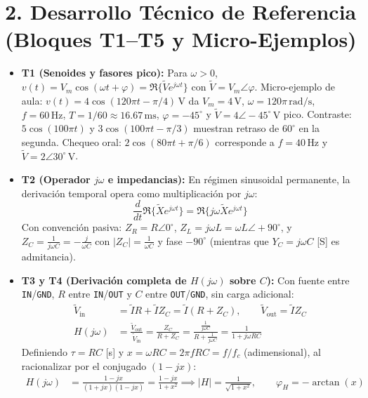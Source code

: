 \documentclass[11pt, a4paper]{article}
\newcommand{\phasor}[1]{\widetilde{#1}}
\begin{document}
\section*{2. Desarrollo Técnico de Referencia (Bloques T1--T5 y Micro-Ejemplos)}
\begin{itemize}\setlength\itemsep{0.2cm}
    \item \textbf{T1 (Senoides y fasores pico):} Para $\omega > 0$, $v(t) = V_m\cos(\omega t + \varphi) = \Re\{\phasor{V}e^{j\omega t}\}$ con $\phasor{V} = V_m\angle\varphi$. Micro-ejemplo de aula: $v(t) = 4\cos(120\pi t - \pi/4)\,\text{V}$ da $V_m = 4\,\text{V}$, $\omega = 120\pi\,\text{rad/s}$, $f = 60\,\text{Hz}$, $T = 1/60 \approx 16.67\,\text{ms}$, $\varphi = -45^\circ$ y $\phasor{V} = 4\angle -45^\circ\,\text{V}$ pico. Contraste: $5\cos(100\pi t)$ y $3\cos(100\pi t - \pi/3)$ muestran retraso de $60^\circ$ en la segunda. Chequeo oral: $2\cos(80\pi t + \pi/6)$ corresponde a $f = 40\,\text{Hz}$ y $\phasor{V} = 2\angle 30^\circ\,\text{V}$.
    \item \textbf{T2 (Operador $j\omega$ e impedancias):} En régimen sinusoidal permanente, la derivación temporal opera como multiplicación por $j\omega$:
    $$\frac{d}{dt}\Re\{\phasor{X}e^{j\omega t}\} = \Re\{j\omega\phasor{X}e^{j\omega t}\}$$
    Con convención pasiva: $Z_R = R\angle 0^\circ$, $Z_L = j\omega L = \omega L\angle +90^\circ$, y $Z_C = \frac{1}{j\omega C} = -\frac{j}{\omega C}$ con $|Z_C| = \frac{1}{\omega C}$ y fase $-90^\circ$ (mientras que $Y_C = j\omega C$ [S] es admitancia).
    \item \textbf{T3 y T4 (Derivación completa de $H(j\omega)$ sobre $C$):} Con fuente entre \texttt{IN}/\texttt{GND}, $R$ entre \texttt{IN}/\texttt{OUT} y $C$ entre \texttt{OUT}/\texttt{GND}, sin carga adicional:
    \begin{align*}
        \phasor{V}_{\text{in}} &= \phasor{I}R + \phasor{I}Z_C = \phasor{I}(R + Z_C), \qquad \phasor{V}_{\text{out}} = \phasor{I}Z_C \\
        H(j\omega) &= \frac{\phasor{V}_{\text{out}}}{\phasor{V}_{\text{in}}} = \frac{Z_C}{R + Z_C} = \frac{\frac{1}{j\omega C}}{R + \frac{1}{j\omega C}} = \frac{1}{1 + j\omega RC}
    \end{align*}
    Definiendo $\tau = RC$ [s] y $x = \omega RC = 2\pi f RC = f/f_c$ (adimensional), al racionalizar por el conjugado $(1 - jx)$:
    \begin{align*}
        H(j\omega) &= \frac{1 - jx}{(1 + jx)(1 - jx)} = \frac{1 - jx}{1 + x^2} \implies |H| = \frac{1}{\sqrt{1 + x^2}}, \qquad \varphi_H = -\arctan(x)

\end{align*}
\end{itemize}
\end{document}
